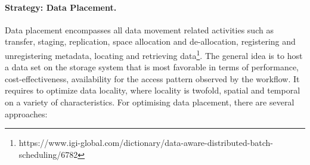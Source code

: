 \documentclass{superfri}
\begin{document}

\paragraph{Strategy: Data Placement.}

Data placement encompasses all data movement related activities such as transfer, staging, replication, space allocation and de-allocation, registering and unregistering metadata, locating and retrieving data\footnote{https://www.igi-global.com/dictionary/data-aware-distributed-batch-scheduling/6782}.
The general idea is to host a data set on the storage system that is most favorable in terms of performance, cost-effectiveness, availability for the access pattern observed by the workflow.
It requires to optimize data locality, where locality is twofold, spatial and temporal on a variety of characteristics.
For optimising data placement, there are several approaches:%
\end{document}
